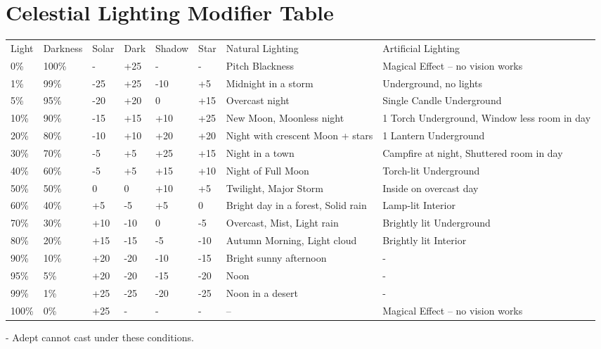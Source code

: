 \begin{table*}
\section{Celestial Lighting Modifier Table}

\begin{tabularx}{\linewidth}{llllllXX}
Light	& Darkness	& Solar	& Dark	& Shadow	& Star	& Natural Lighting		& Artificial Lighting \\
0\%	& 100\%		& -	& +25	& -		& -	& Pitch Blackness		& Magical Effect – no vision works \\
1\%	& 99\%		& -25	& +25	& -10		& +5	& Midnight in a storm		& Underground, no lights \\
5\%	& 95\%		& -20	& +20	& 0		& +15	& Overcast night		& Single Candle Underground \\
10\%	& 90\%		& -15	& +15	& +10		& +25	& New Moon, Moonless night	& 1 Torch Underground, Window less room in day \\
20\%	& 80\%		& -10	& +10	& +20		& +20	& Night with crescent Moon + stars	& 1 Lantern Underground	\\
30\%	& 70\%		& -5	& +5	& +25		& +15	& Night in a town		& Campfire at night, Shuttered room in day \\
40\%	& 60\%		& -5	& +5	& +15		& +10	& Night of Full Moon		& Torch-lit Underground	\\
50\%	& 50\%		& 0	& 0	& +10		& +5	& Twilight, Major Storm		& Inside on overcast day \\
60\%	& 40\%		& +5	& -5	& +5		& 0	& Bright day in a forest, Solid rain	& Lamp-lit Interior \\
70\%	& 30\%		& +10	& -10	& 0		& -5	& Overcast, Mist, Light rain	& Brightly lit Underground \\
80\%	& 20\%		& +15	& -15	& -5		& -10	& Autumn Morning, Light cloud	& Brightly lit Interior	\\
90\%	& 10\%		& +20	& -20	& -10		& -15	& Bright sunny afternoon	& - \\
95\%	& 5\%		& +20	& -20	& -15		& -20	& Noon				& - \\
99\%	& 1\%		& +25	& -25	& -20		& -25	& Noon in a desert		& - \\
100\%	& 0\%		& +25	& -	& -		& -	& –				& Magical Effect – no vision works \\
\end{tabularx}

- Adept cannot cast under these conditions. 
\end{table*}

